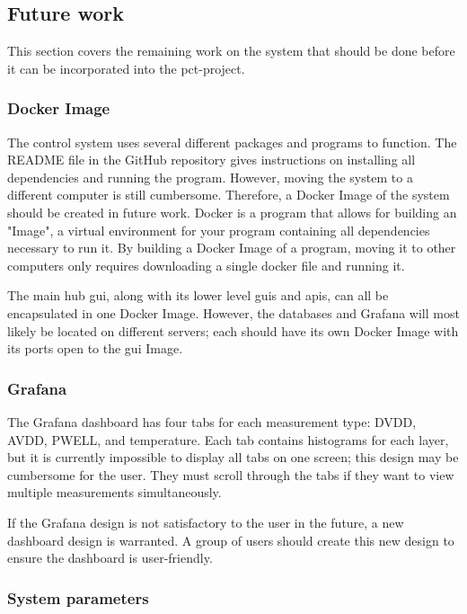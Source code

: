 \documentclass[main.tex]{subfiles}
\begin{document}
\subsection{Future work}

This section covers the remaining work on the system that should be done before it can be incorporated into the \gls{pct}-project.

\subsubsection{Docker Image}
 
The control system uses several different packages and programs to function. The README file in the GitHub repository gives instructions on installing all dependencies and running the program. However, moving the system to a different computer is still cumbersome. Therefore, a Docker Image of the system should be created in future work. Docker is a program that allows for building an "Image", a virtual environment for your program containing all dependencies necessary to run it. By building a Docker Image of a program, moving it to other computers only requires downloading a single docker file and running it.
 
 The main hub \gls{gui}, along with its lower level \gls{gui}s and \gls{api}s, can all be encapsulated in one Docker Image. However, the databases and Grafana will most likely be located on different servers; each should have its own Docker Image with its ports open to the \gls{gui} Image.

\subsubsection{Grafana}

The Grafana dashboard has four tabs for each measurement type: DVDD, AVDD, PWELL, and temperature. Each tab contains histograms for each layer, but it is currently impossible to display all tabs on one screen; this design may be cumbersome for the user. They must scroll through the tabs if they want to view multiple measurements simultaneously.

If the Grafana design is not satisfactory to the user in the future, a new dashboard design is warranted. A group of users should create this new design to ensure the dashboard is user-friendly.

\subsubsection{System parameters}
\end{document}
